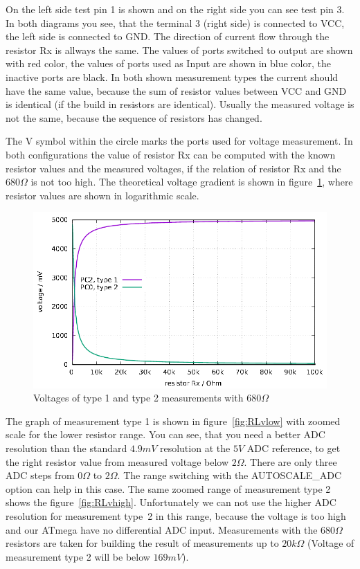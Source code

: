 On the left side test pin 1 is shown and on the right side you can see test pin 3.
In both diagrams you see, that the terminal 3 (right side) is connected to VCC, the left side is
connected to GND. The direction of current flow through the resistor Rx is allways the same. 
The values of ports switched to output are shown with red color, the values of 
ports used as Input are shown in blue color, the inactive ports are black.
In both shown measurement types the current should have the same value, because the sum of resistor values
between VCC and GND is identical (if the build in resistors are identical).
Usually the measured voltage is not the same, because the sequence
of resistors has changed.

The V symbol within the circle marks the ports used for voltage measurement.
In both configurations the value of resistor Rx can be computed with the known
resistor values and the measured voltages, if the relation of resistor Rx and the \(680\Omega\) is not too high.
The theoretical voltage gradient is shown in figure~\ref{fig:RLvtot}, where resistor values are shown in logarithmic scale.
\begin{figure}[H]
\centering
\includegraphics[width=16cm]{../GNU/RLvtot.pdf}
\caption{Voltages of type 1 and type 2 measurements with \(680\Omega\) }
\label{fig:RLvtot}
\end{figure}
The graph of measurement type 1 is shown in figure~\ref{fig:RLvlow} with zoomed scale for the lower resistor range.
You can see, that you need a better ADC resolution than the standard \(4.9mV\) resolution at the \(5V\) ADC reference, to get
the right resistor value from measured voltage below \(2\Omega\).
There are only three ADC steps from \(0\Omega\) to \(2\Omega\).
The range switching with the AUTOSCALE\_ADC option can help in this case.
The same zoomed range of measurement type 2 shows the figure~\ref{fig:RLvhigh}.
Unfortunately we can not use the higher ADC resolution for measurement type~2 in this range,
 because the voltage is too high and our ATmega have no differential ADC input.
Measurements with the \(680\Omega\) resistors are taken for building the result of measurements up to \(20k\Omega\)
(Voltage of measurement type 2 will be below \(169mV\)).

